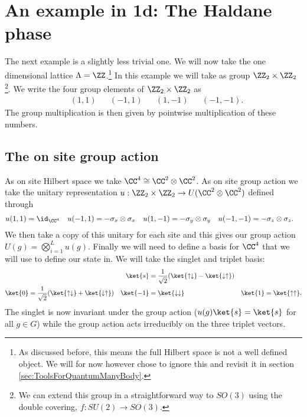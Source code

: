 \section{An example in 1d: The Haldane phase}\label{sec:an-example-in-1d-the-haldane-phase}
The next example is a slightly less trivial one. We will now take the one dimensional lattice $\Lambda=\ZZ$.\footnote{As discussed before, this means the full Hilbert space is not a well defined object. We will for now however chose to ignore this and revisit it in section \ref{sec:ToolsForQuantumManyBody}.} In this example we will take as group $\ZZ_2\times\ZZ_2$\footnote{We can extend this group in a straightforward way to $SO(3)$ using the double covering, $f:SU(2)\rightarrow SO(3)$.}. We write the four group elements of $\ZZ_2\times\ZZ_2$ as
\begin{align}
&(1,1)&&(-1,1)&&(1,-1)&&(-1,-1).
\end{align}
The group multiplication is then given by pointwise multiplication of these numbers.
\subsection{The on site group action}
As on site Hilbert space we take $\CC^4\cong \CC^2\otimes\CC^2$. As on site group action we take the unitary representation $u:\ZZ_2\times\ZZ_2\rightarrow U(\CC^2\otimes\CC^2)$ defined through
\begin{align}\label{eq:OnSiteActionOfFakeAKLT_Model}
u(1,1)&=\id_{\CC^4}&u(-1,1)&=-\sigma_x\otimes\sigma_x&u(1,-1)&=-\sigma_y\otimes\sigma_y&u(-1,-1)&=-\sigma_z\otimes\sigma_z.
\end{align}
We then take a copy of this unitary for each site and this gives our group action $U(g)=\bigotimes_{i=1}^{L}u(g)$. Finally we will need to define a basis for $\CC^4$ that we will use to define our state in. We will take the singlet and triplet basis:
\begin{align}
&&\ket{s}&=\frac{1}{\sqrt{2}}(\ket{\uparrow\downarrow}-\ket{\downarrow\uparrow})&&\\
\ket{0}&=\frac{1}{\sqrt{2}}(\ket{\uparrow\downarrow}+\ket{\downarrow\uparrow})&\ket{-1}&=\ket{\downarrow\downarrow}&\ket{1}&=\ket{\uparrow\uparrow}.
\end{align}
The singlet is now invariant under the group action ($u(g)\ket{s}=\ket{s}$ for all $g\in G$) while the group action acts irreducibly on the three triplet vectors.
